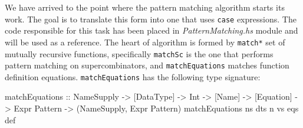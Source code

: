 \documentclass[12pt,a4paper]{report}
\begin{document}
We have arrived to the point where the pattern matching algorithm starts its
work. The goal is to translate this form into one that uses \texttt{case}
expressions. The code responsible for this task has been placed in
\textit{PatternMatching.hs} module and will be used as a reference. The heart
of algorithm is formed by \texttt{match*} set of mutually recursive functions,
specifically \texttt{matchSc} is the one that performs pattern matching on
supercombinators, and \texttt{matchEquations} matches function definition
equations. \texttt{matchEquations} has the following type signature:

\vspace*{0.2in}
\begin{code}[style=haskell]
matchEquations :: NameSupply
               -> [DataType]
               -> Int
               -> [Name]
               -> [Equation]
               -> Expr Pattern
               -> (NameSupply, Expr Pattern)
matchEquations ns dts n vs eqs def
\end{code}
\end{document}
